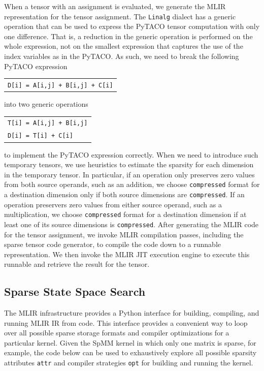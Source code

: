 \documentclass[10pt]{article}
\newcommand{\exam}{\begin{flushleft}\scriptsize\begin{tabular}{l}}
\newcommand{\maxe}{\end{tabular}\end{flushleft}}
\begin{document}
When a tensor with an assignment is evaluated, we generate the MLIR representation for the tensor assignment. The \texttt{Linalg} dialect has a generic operation that can be used to express the PyTACO tensor computation with only one difference. That is, a reduction in the generic operation is performed on the whole expression, not on the smallest expression that captures the use of the index variables as in the PyTACO. As such, we need to break the following PyTACO expression
\exam
\verb"D[i] = A[i,j] + B[i,j] + C[i]" \\
\maxe
into two generic operations
\exam
\verb"T[i] = A[i,j] + B[i,j]" \\
\verb"D[i] = T[i] + C[i]"
\maxe
to implement the PyTACO expression correctly. When we need to introduce such temporary tensors, we use heuristics to estimate the sparsity for each dimension in the temporary tensor. In particular, if an operation only preserves zero values from both source operands, such as an addition, we choose \texttt{compressed} format for a destination dimension only if both source dimensions are \texttt{compressed}. If an operation preservers zero values from either source operand, such as a multiplication, we choose \texttt{compressed} format for a destination dimension if at least one of its source dimensions is \texttt{compressed}.
After generating the MLIR code for the tensor assignment, we invoke MLIR compilation passes, including the sparse tensor code generator, to compile the code down to a runnable representation. We then invoke the MLIR JIT execution engine to execute this runnable and retrieve the result for the tensor.

\subsection{Sparse State Space Search}

The MLIR infrastructure provides a Python interface for building, compiling, and running MLIR IR from code. This interface provides a convenient way to loop over all possible sparse storage formats and compiler optimizations for a particular kernel. Given the SpMM kernel in which only one matrix is sparse, for example, the code below can be used to exhaustively explore all possible sparsity attributes \texttt{attr} and compiler strategies \texttt{opt} for building and running the kernel.
\end{document}
